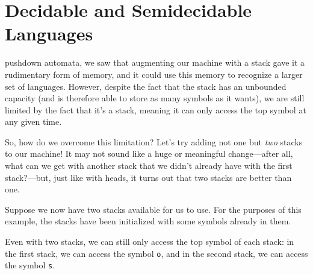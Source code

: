 \chapter{Decidable and Semidecidable Languages}\label{chap:decidablesemidecidable}

 pushdown automata, we saw that augmenting our machine with a stack gave it a rudimentary form of memory, and it could use this memory to recognize a larger set of languages. However, despite the fact that the stack has an unbounded capacity (and is therefore able to store as many symbols as it wants), we are still limited by the fact that it's a stack, meaning it can only access the top symbol at any given time.

So, how do we overcome this limitation? Let's try adding not one but \emph{two} stacks to our machine! It may not sound like a huge or meaningful change---after all, what can we get with another stack that we didn't already have with the first stack?---but, just like with heads, it turns out that two stacks are better than one.

Suppose we now have two stacks available for us to use. For the purposes of this example, the stacks have been initialized with some symbols already in them.
\begin{center}
\end{center}
Even with two stacks, we can still only access the top symbol of each stack: in the first stack, we can access the symbol \texttt{o}, and in the second stack, we can access the symbol \texttt{s}.

